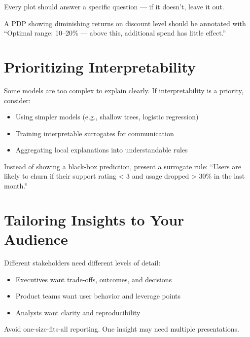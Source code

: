 \documentclass[12pt,openany]{book}
\begin{document}
\begin{notebox}
Every plot should answer a specific question — if it doesn’t, leave it out.
\end{notebox}

\begin{examplebox}
A PDP showing diminishing returns on discount level should be annotated with “Optimal range: 10–20\% — above this, additional spend has little effect.”
\end{examplebox}



\section{Prioritizing Interpretability}

Some models are too complex to explain clearly. If interpretability is a priority, consider:
\begin{itemize}
  \item Using simpler models (e.g., shallow trees, logistic regression)
  \item Training interpretable surrogates for communication
  \item Aggregating local explanations into understandable rules
\end{itemize}

\begin{examplebox}
Instead of showing a black-box prediction, present a surrogate rule: “Users are likely to churn if their support rating < 3 and usage dropped > 30\% in the last month.”
\end{examplebox}



\section{Tailoring Insights to Your Audience}

Different stakeholders need different levels of detail:
\begin{itemize}
  \item Executives want trade-offs, outcomes, and decisions
  \item Product teams want user behavior and leverage points
  \item Analysts want clarity and reproducibility
\end{itemize}

\begin{notebox}
Avoid one-size-fits-all reporting. One insight may need multiple presentations.
\end{notebox}
\end{document}
